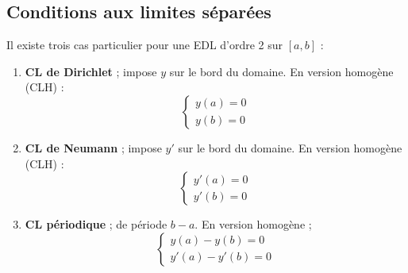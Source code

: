 \documentclass[11pt, a4paper, openany]{book}
\begin{document}
		\subsection{Conditions aux limites séparées}
		Il existe trois cas particulier pour une EDL d'ordre 2 sur $[a,b]$ :
		\begin{enumerate}
			\item \textbf{CL de Dirichlet} ; impose $y$ sur le bord du domaine. En version homogène (CLH) :
			      \begin{equation}
			      	\left\{\begin{array}{l}
			      	y(a) = 0\\
			      	y(b) = 0
			      	\end{array}\right.
			      \end{equation}
			\item \textbf{CL de Neumann} ; impose $y'$ sur le bord du domaine. En version homogène (CLH) :
			      \begin{equation}
			      	\left\{\begin{array}{l}
			      	y'(a) = 0\\
			      	y'(b) = 0
			      	\end{array}\right.
			      \end{equation}
			\item \textbf{CL périodique} ; de période $b-a$. En version homogène ;
			      \begin{equation}
			      	\left\{\begin{array}{l}
			      	y(a)-y(b) = 0\\
			      	y'(a) - y'(b) = 0
			      	\end{array}\right.
			      \end{equation}
		\end{enumerate}
\end{document}
